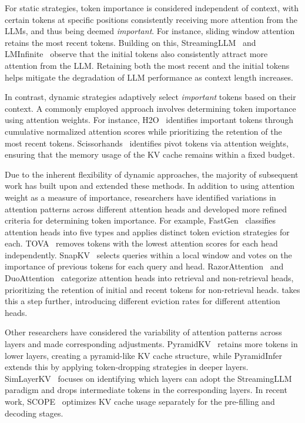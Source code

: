 For static strategies, token importance is considered independent of context, with certain tokens at specific positions consistently receiving more attention from the LLMs, and thus being deemed \textit{important}. For instance, sliding window attention~\citep{jiang2023mistral, bai2023qwen} retains the most recent tokens. Building on this, StreamingLLM~\citep{xiaoefficient} and LMInfinite~\citep{han2024lm} observe that the initial tokens also consistently attract more attention from the LLM. Retaining both the most recent and the initial tokens helps mitigate the degradation of LLM performance as context length increases.

In contrast, dynamic strategies adaptively select \textit{important} tokens based on their context. A commonly employed approach involves determining token importance using attention weights. For instance, H2O~\citep{zhang2023h2o} identifies important tokens through cumulative normalized attention scores while prioritizing the retention of the most recent tokens. Scissorhands~\citep{liu2024scissorhands} identifies pivot tokens via attention weights, ensuring that the memory usage of the KV cache remains within a fixed budget.

Due to the inherent flexibility of dynamic approaches, the majority of subsequent work has built upon and extended these methods. In addition to using attention weight as a measure of importance, researchers have identified variations in attention patterns across different attention heads and developed more refined criteria for determining token importance. For example, FastGen~\citep{ge2023model} classifies attention heads into five types and applies distinct token eviction strategies for each. TOVA~\citep{oren2024transformers} removes tokens with the lowest attention scores for each head independently. SnapKV~\citep{li2024snapkv} selects queries within a local window and votes on the importance of previous tokens for each query and head. RazorAttention~\citep{tang2024razorattention} and DuoAttention~\citep{xiao2024duoattention} categorize attention heads into retrieval and non-retrieval heads, prioritizing the retention of initial and recent tokens for non-retrieval heads. \citet{rehg2024kv} takes this a step further, introducing different eviction rates for different attention heads.

Other researchers have considered the variability of attention patterns across layers and made corresponding adjustments. PyramidKV~\citep{cai2024pyramidkv} retains more tokens in lower layers, creating a pyramid-like KV cache structure, while PyramidInfer~\citep{yang2024pyramidinfer} extends this by applying token-dropping strategies in deeper layers. SimLayerKV~\citep{zhang2024simlayerkv} focuses on identifying which layers can adopt the StreamingLLM~\citep{xiaoefficient} paradigm and drops intermediate tokens in the corresponding layers. In recent work, SCOPE~\citep{wu2024scope} optimizes KV cache usage separately for the pre-filling and decoding stages.

